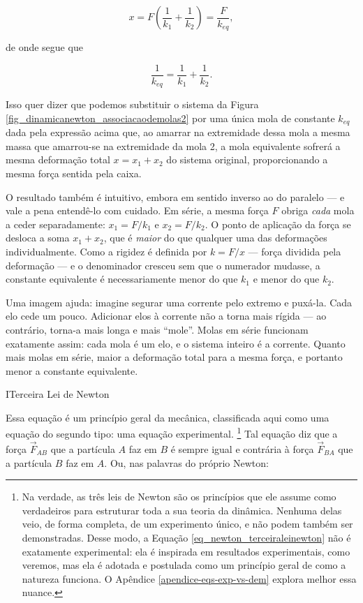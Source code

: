 \begin{exemplo}
$$ x = F\!\left(\frac{1}{k_1} + \frac{1}{k_2}\right) = \dfrac{F}{k_{eq}} ,  $$

\noindent de onde segue que

\[
  \boxed{\frac{1}{k_{eq}} = \frac{1}{k_1} + \frac{1}{k_2}.}
\]

\noindent Isso quer dizer que podemos substituir o sistema da Figura \ref{fig_dinamicanewton_associacaodemolas2} por uma única mola de constante $k_{eq}$ dada pela expressão acima que, ao amarrar na extremidade dessa mola a mesma massa que amarrou-se na extremidade da mola 2, a mola equivalente sofrerá a mesma deformação total $x=x_1+x_2$ do sistema original, proporcionando a mesma força sentida pela caixa.

\noindent O resultado também é intuitivo, embora em sentido inverso
ao do paralelo --- e vale a pena entendê-lo com cuidado. Em série,
a mesma força $F$ obriga \emph{cada} mola a ceder separadamente:
$x_1 = F/k_1$ e $x_2 = F/k_2$. O ponto de aplicação da força se
desloca a soma $x_1 + x_2$, que é \emph{maior} do que qualquer uma
das deformações individualmente. Como a rigidez é definida por
$k = F/x$ --- força dividida pela deformação --- e o denominador
cresceu sem que o numerador mudasse, a constante equivalente é
necessariamente menor do que $k_1$ e menor do que $k_2$.

Uma imagem ajuda: imagine segurar uma corrente pelo extremo e
puxá-la. Cada elo cede um pouco. Adicionar elos à corrente não a
torna mais rígida --- ao contrário, torna-a mais longa e mais
``mole''. Molas em série funcionam exatamente assim: cada mola é
um elo, e o sistema inteiro é a corrente. Quanto mais molas em
série, maior a deformação total para a mesma força, e portanto menor
a constante equivalente.

\end{exemplo}





\begin{secnivel}{I}{Terceira Lei de Newton}
  

\end{secnivel}




Essa equação é um princípio geral da mecânica, classificada aqui como uma equação do segundo tipo: uma equação experimental. \footnote{Na verdade, as três leis de Newton são os princípios que ele assume como verdadeiros para estruturar toda a sua teoria da dinâmica. Nenhuma delas veio, de forma completa, de um experimento único, e não podem também ser demonstradas. Desse modo, a Equação \eqref{eq_newton_terceiraleinewton} não é exatamente experimental: ela é inspirada em resultados experimentais, como veremos, mas ela é adotada e postulada como um princípio geral de como a natureza funciona. O Apêndice \ref{apendice-eqs-exp-vs-dem} explora melhor essa nuance.} Tal equação diz que a força $\vec F_{AB}$ que a partícula $A$ faz em $B$ é sempre igual e contrária à força $\vec F_{BA}$ que a partícula $B$ faz em $A.$ Ou, nas palavras do próprio Newton:

